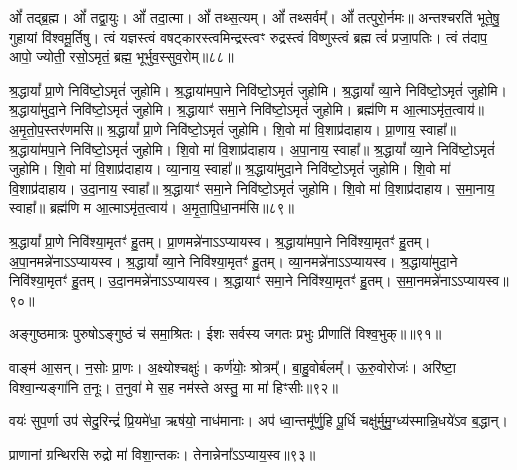 ओं᳚ तद्ब्र॒ह्म। 
ओं᳚ तद्वा॒युः। 
ओं᳚ तदा॒त्मा। 
ओं᳚ तथ्स॒त्यम्‌।
ओं᳚ तथ्सर्वम्᳚‌। 
ओं᳚ तत्पुरो॒र्नमः॥
अन्तश्चरति॑ भूते॒षु॒ गुहायां वि॑श्वमू॒र्तिषु।
त्वं यज्ञस्त्वं वषट्कारस्त्वमिन्द्रस्त्वꣳ रुद्रस्त्वं विष्णुस्त्वं ब्रह्म त्वं॑ प्रजा॒पतिः।
त्वं त॑दाप॒ आपो॒ ज्योती॒ रसो॒ऽमृतं॒ ब्रह्म॒ भूर्भुव॒स्सुव॒रोम्‌॥८८॥
\anuvakamend

श्र॒द्धायां᳚ प्रा॒णे निवि॑ष्टो॒\-ऽ\-मृतं॑ जुहोमि। 
श्र॒द्धाया॑\-मपा॒ने निवि॑ष्टो॒\-ऽ\-मृतं॑ जुहोमि। 
श्र॒द्धायां᳚ व्या॒ने निवि॑ष्टो॒\-ऽ\-मृतं॑ जुहोमि। 
श्र॒द्धाया॑\-मुदा॒ने निवि॑ष्टो॒\-ऽ\-मृतं॑ जुहोमि। 
श्र॒द्धायाꣳ॑ समा॒ने निवि॑ष्टो॒\-ऽ\-मृतं॑ जुहोमि। 
ब्रह्म॑णि म आ॒त्माऽमृ॑त॒त्वाय॑॥ 
अ॒मृ॒तो॒प॒स्तर॑णमसि॥ 
श्र॒द्धायां᳚ प्रा॒णे निवि॑ष्टो॒\-ऽ\-मृतं॑ जुहोमि। 
शि॒वो मा॑ वि॒शाप्र॑दाहाय। 
प्रा॒णाय॒ स्वाहा᳚॥ 
श्र॒द्धाया॑\-मपा॒ने निवि॑ष्टो॒\-ऽ\-मृतं॑ जुहोमि। 
शि॒वो मा॑ वि॒शाप्र॑दाहाय। 
अ॒पा॒नाय॒ स्वाहा᳚॥ 
श्र॒द्धायां᳚ व्या॒ने निवि॑ष्टो॒\-ऽ\-मृतं॑ जुहोमि। 
शि॒वो मा॑ वि॒शाप्र॑दाहाय। 
व्या॒नाय॒ स्वाहा᳚॥ 
श्र॒द्धाया॑\-मुदा॒ने निवि॑ष्टो॒\-ऽ\-मृतं॑ जुहोमि। 
शि॒वो मा॑ वि॒शाप्र॑दाहाय। 
उ॒दा॒नाय॒ स्वाहा᳚॥ 
श्र॒द्धायाꣳ॑ समा॒ने निवि॑ष्टो॒\-ऽ\-मृतं॑ जुहोमि। 
शि॒वो मा॑ वि॒शाप्र॑दाहाय। 
स॒मा॒नाय॒ स्वाहा᳚॥ 
ब्रह्म॑णि म आ॒त्माऽमृ॑त॒त्वाय॑। 
अ॒मृ॒ता॒पि॒धा॒नम॑सि॥८९॥
\anuvakamend


श्र॒द्धायां᳚ प्रा॒णे निवि॑श्या॒मृतꣳ॑ हु॒तम्। 
प्रा॒णमन्ने॑ना\-ऽऽप्यायस्व। 
श्र॒द्धाया॑\-मपा॒ने निवि॑श्या॒मृतꣳ॑ हु॒तम्। 
अ॒पा॒नमन्ने॑ना\-ऽऽप्यायस्व।
श्र॒द्धायां᳚ व्या॒ने निवि॑श्या॒मृतꣳ॑ हु॒तम्। 
व्या॒नमन्ने॑ना\-ऽऽप्यायस्व। 
श्र॒द्धाया॑\-मुदा॒ने निवि॑श्या॒मृतꣳ॑ हु॒तम्। 
उ॒दा॒नमन्ने॑ना\-ऽऽप्यायस्व।
श्र॒द्धायाꣳ॑ समा॒ने निवि॑श्या॒मृतꣳ॑ हु॒तम्। 
स॒मा॒नमन्ने॑ना\-ऽऽप्यायस्व॥९०॥\anuvakamend

अङ्गुष्ठमात्रः पुरुषोऽङ्गुष्ठं च॑ समा॒श्रितः। 
ईशः सर्वस्य जगतः प्रभुः प्रीणाति॑ विश्व॒भुक्॥॥९१॥\anuvakamend

वाङ्म॑ आ॒सन्। 
न॒सोः प्रा॒णः। 
अ॒क्ष्योश्चक्षुः॑। 
कर्ण॑योः॒ श्रोत्रम्᳚। 
बा॒हु॒वोर्बलम्᳚। 
ऊ॒रु॒वोरोजः॑। 
अरि॑ष्टा॒ विश्वा॒न्यङ्गा॑नि त॒नूः। 
त॒नुवा॑ मे स॒ह नम॑स्ते अस्तु॒ मा मा॑ हिꣳसीः॥९२॥\anuvakamend

वयः॑ सुप॒र्णा उप॑ सेदु॒रिन्द्रं॑ प्रि॒यमे॑धा॒ ऋष॑यो॒ नाध॑मानाः। 
अप॑ ध्वा॒न्तमू᳚र्णु॒हि पू॒र्धि चक्षु॑र्मुमु॒ग्ध्य॑स्मान्नि॒धये॑ऽव ब॒द्धान्।\anuvakamend

प्राणानां ग्रन्थिरसि रुद्रो मा॑ विशा॒न्तकः। 
तेनान्नेना᳚\-ऽऽप्याय॒स्व॥९३॥\anuvakamend

